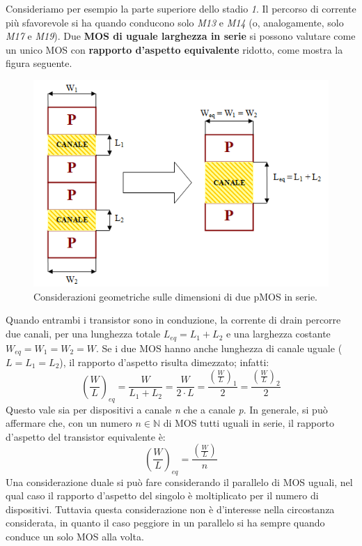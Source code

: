 Consideriamo per esempio la parte superiore dello stadio \textit{1}. Il percorso di corrente più sfavorevole si ha quando conducono solo \textit{M13} e \textit{M14} (o, analogamente, solo \textit{M17} e \textit{M19}). Due \textbf{MOS di uguale larghezza in serie} si possono valutare come un unico MOS con \textbf{rapporto d'aspetto equivalente} ridotto, come mostra la figura seguente.

\begin{figure}[hbt!]
	\centering
	\includegraphics{figure/PMOS_series.png}
	\caption{Considerazioni geometriche sulle dimensioni di due pMOS in serie.}
	\label{fig:PMOS_series}
\end{figure}

Quando entrambi i transistor sono in conduzione, la corrente di drain percorre due canali, per una lunghezza totale $L_{eq} = L_1 + L_2$ e una larghezza costante $W_{eq} = W_1 = W_2 = W$. Se i due MOS hanno anche lunghezza di canale uguale ($L=L_1 = L_2$), il rapporto d'aspetto risulta dimezzato; infatti:
\begin{equation}
	\left ( \frac{W}{L} \right ) _{eq} = \frac{W}{L_1 + L_2} = \frac{W}{2 \cdot L} =  \frac{\left ( \frac{W}{L} \right ) _{1}}{2} = \frac{\left ( \frac{W}{L} \right ) _{2}}{2} 
\end{equation}
Questo vale sia per dispositivi a canale \textit{n} che a canale \textit{p}.
In generale, si può affermare che, con un numero $n \in  \mathbb{N}$ di MOS tutti uguali in serie, il rapporto d'aspetto del transistor equivalente è:
\begin{equation}
\left ( \frac{W}{L} \right ) _{eq} = \frac{\left ( \frac{W}{L} \right )}{n} 
\end{equation}
Una considerazione duale si può fare considerando il parallelo di MOS uguali, nel qual caso il rapporto d'aspetto del singolo è moltiplicato per il numero di dispositivi. Tuttavia questa considerazione non è d'interesse nella circostanza considerata, in quanto il caso peggiore in un parallelo si ha sempre quando conduce un solo MOS alla volta.


